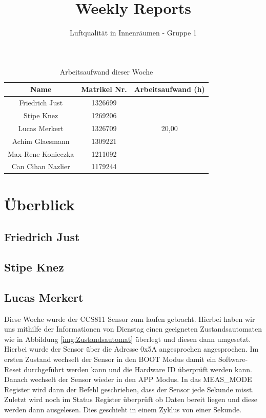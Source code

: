 \documentclass[]{article}
\title{Weekly Reports}
\author{Luftqualität in Innenräumen - Gruppe 1}
\begin{document}
\maketitle

\begin{table}[h!]
	\centering
	\begin{tabular}{|c|c|c|}
		\hline
		{\textbf{Name}}				&		{\textbf{Matrikel Nr.}} & {\textbf{Arbeitsaufwand (h)}} \\
		\hline
		Friedrich Just				&		1326699 				&		\\
		\hline
		Stipe Knez				&		1269206 				&	\\
		\hline
		Lucas Merkert				&		1326709					&	20,00	\\
		\hline
		Achim Glaesmann				&		1309221					&		\\
		\hline
		Max-Rene Konieczka			&		1211092					&		\\
		\hline
		Can Cihan Nazlier			&		1179244					&		\\
		\hline
	\end{tabular}
	\caption{Arbeitsaufwand dieser Woche}
	\label{tab:worakload}
\end{table}



\section{Überblick}


\subsection{Friedrich Just}



\subsection{Stipe Knez}

\subsection{Lucas Merkert}
Diese Woche wurde der CCS811 Sensor zum laufen gebracht. Hierbei haben wir uns mithilfe der Informationen von Dienstag einen geeigneten Zustandsautomaten wie in Abbildung \ref{img:Zustandsautomat} überlegt und diesen dann umgesetzt. Hierbei wurde der Sensor über die Adresse 0x5A angesprochen angesprochen. Im ersten Zustand wechselt der Sensor in den BOOT Modus damit ein Software-Reset durchgeführt werden kann und die Hardware ID überprüft werden kann. Danach wechselt der Sensor wieder in den APP Modus. In das MEAS\_MODE Register wird dann der Befehl geschrieben, dass der Sensor jede Sekunde misst. Zuletzt wird noch im Status Register überprüft ob Daten bereit liegen und diese werden dann ausgelesen. Dies geschieht in einem Zyklus von einer Sekunde.
\end{document}
